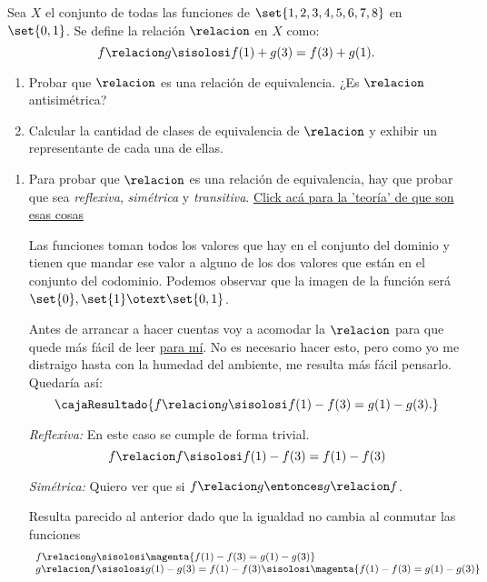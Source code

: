 \begin{enunciado}{\ejExtra}
  Sea $X$ el conjunto de todas las funciones de $\set{1,2,3,4,5,6,7,8}$ en $\set{0,1}$. Se define la relación $\relacion$ en $X$ como:
  $$
    f \relacion g \sisolosi f(1) + g(3) = f(3) + g(1).
  $$
  \begin{enumerate}[label=\alph*)]
    \item Probar que $\relacion$ es una relación de equivalencia. ¿Es $\relacion$ antisimétrica?
    \item Calcular la cantidad de clases de equivalencia de $\relacion$ y exhibir un representante de cada una de ellas.
  \end{enumerate}
\end{enunciado}

\begin{enumerate}[label=\alph*)]
  \item
        Para probar que $\relacion$ es una relación de equivalencia, hay que probar que sea \textit{reflexiva}, \textit{simétrica} y \textit{transitiva}.
        \hyperlink{teoria-1:prop-relaciones}{Click acá para la 'teoría' de que son esas cosas}\par

        \bigskip

        Las funciones toman todos los valores que hay en el conjunto del dominio y tienen que mandar ese valor a alguno de los dos valores que están
        en el conjunto del codominio. Podemos observar que la imagen de la función será $\set{0}, \set{1} \otext \set{0,1}$.

        Antes de arrancar a hacer cuentas voy a acomodar la $\relacion$ para que quede más fácil de leer \underline{para mí}.
        No es necesario hacer esto, pero como yo me distraigo hasta con la humedad del ambiente, me resulta más fácil pensarlo. Quedaría así:
        $$
          \cajaResultado{
            f \relacion g \sisolosi f(1) - f(3) = g(1) - g(3).
          }
        $$

        \textit{Reflexiva:} En este caso se cumple de forma trivial.
        $$
          f \relacion f \sisolosi f(1) - f(3) = f(1) - f(3)
        $$

        \textit{Simétrica:}
        Quiero ver que si $f \relacion g \entonces g \relacion f$.\par Resulta parecido al anterior dado que la igualdad no cambia al conmutar las funciones
        $$
          \begin{array}{l}
            f \relacion g \sisolosi \magenta{f(1) - f(3) = g(1) - g(3)} \\
            g \relacion f \sisolosi g(1) - g(3) = f(1) - f(3) \sisolosi \magenta{f(1) - f(3) = g(1) - g(3)}
          \end{array}
        $$


\end{enumerate}
